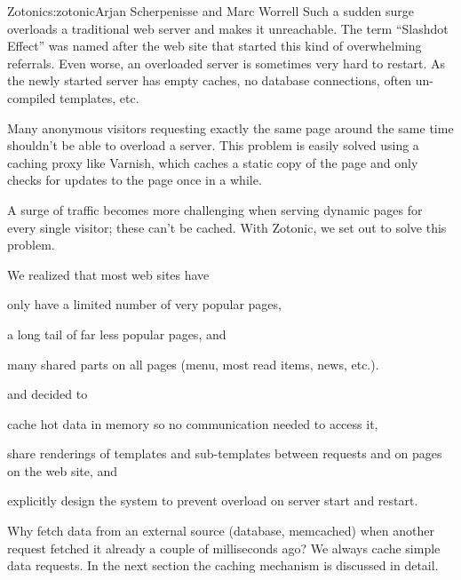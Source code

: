 \begin{aosachapter}{Zotonic}{s:zotonic}{Arjan Scherpenisse and Marc Worrell}
Such a sudden surge overloads a traditional web server and makes it
unreachable. The term ``Slashdot Effect'' was named after the web site
that started this kind of overwhelming referrals. Even worse, an
overloaded server is sometimes very hard to restart. As the newly
started server has empty caches, no database connections, often
un-compiled templates, etc.

Many anonymous visitors requesting exactly the same page around the same
time shouldn't be able to overload a server. This problem is easily
solved using a caching proxy like Varnish, which caches a static copy of
the page and only checks for updates to the page once in a while.

A surge of traffic becomes more challenging when serving dynamic pages
for every single visitor; these can't be cached. With Zotonic, we set
out to solve this problem.

We realized that most web sites have

\begin{aosaitemize}

\item
  only have a limited number of very popular pages,
\item
  a long tail of far less popular pages, and
\item
  many shared parts on all pages (menu, most read items, news, etc.).
\end{aosaitemize}

\noindent and decided to

\begin{aosaitemize}

\item
  cache hot data in memory so no communication needed to access it,
\item
  share renderings of templates and sub-templates between requests and
  on pages on the web site, and
\item
  explicitly design the system to prevent overload on server start and
  restart.
\end{aosaitemize}


Why fetch data from an external source (database, memcached) when
another request fetched it already a couple of milliseconds ago? We
always cache simple data requests. In the next section the caching
mechanism is discussed in detail.



\end{aosachapter}
